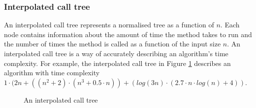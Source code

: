 \subsubsection{Interpolated call tree}
An interpolated call tree represents a normalised tree as a function of $n$. Each node contains information about the amount of time the method takes to run and the number of times the method is called as a function of the input size $n$. An interpolated call tree is a way of accurately describing an algorithm's time complexity. For example, the interpolated call tree in Figure \ref{fig:interpolatedcalltree} describes an algorithm with time complexity $1 \cdot (2n + ((n^2 + 2) \cdot (n^3 + 0.5 \cdot n)) + (log(3n) \cdot (2.7 \cdot n \cdot log(n) + 4))$.

\begin{figure}
  \centering
  \caption{An interpolated call tree}
  \label{fig:interpolatedcalltree}
\end{figure}




